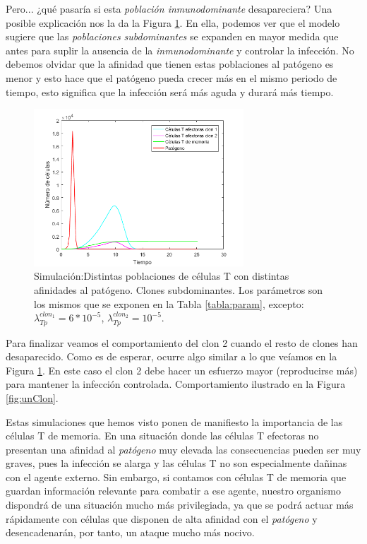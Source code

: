 Pero... ¿qué pasaría si esta \textit{población inmunodominante} desapareciera? Una posible explicación nos la da la Figura \ref{fig:dosClones}. En ella, podemos ver que el modelo sugiere que las \textit{poblaciones subdominantes} se expanden en mayor medida que antes para suplir la ausencia de la \textit{inmunodominante} y controlar la infección. No debemos olvidar que la afinidad que tienen estas poblaciones al patógeno es menor y esto hace que el patógeno pueda crecer más en el mismo periodo de tiempo, esto significa que la infección será más aguda y durará más tiempo. 


\begin{figure}[t]
	\centering
	\includegraphics[width=0.7\textwidth]{Imagenes/Simulaciones/dosClones}
	\caption{Simulación:Distintas poblaciones de células T con distintas afinidades al patógeno. Clones subdominantes. Los parámetros son los mismos que se exponen en la Tabla \ref{tabla:param}, excepto: $\lambda_{Tp}^{clon_1} = 6*10^{-5}$, $\lambda_{Tp}^{clon_2} = 10^{-5}$.}
	\label{fig:dosClones}
\end{figure}

Para finalizar veamos el comportamiento del clon 2 cuando el resto de clones han desaparecido. Como es de esperar, ocurre algo similar a lo que veíamos en la Figura \ref{fig:dosClones}. En este caso el clon 2 debe hacer un esfuerzo mayor (reproducirse más) para mantener la infección controlada. Comportamiento ilustrado en la Figura \ref{fig:unClon}.

Estas simulaciones que hemos visto ponen de manifiesto la importancia de las células T de memoria. En una situación donde las células T efectoras no presentan una afinidad al \textit{patógeno} muy elevada las consecuencias pueden ser muy graves, pues la infección se alarga y las células T no son especialmente dañinas con el agente externo. Sin embargo, si contamos con células T de memoria que guardan información relevante para combatir a ese agente, nuestro organismo dispondrá de una situación mucho más privilegiada, ya que se podrá actuar más rápidamente con células que disponen de alta afinidad con el \textit{patógeno} y desencadenarán, por tanto, un ataque mucho más nocivo.

